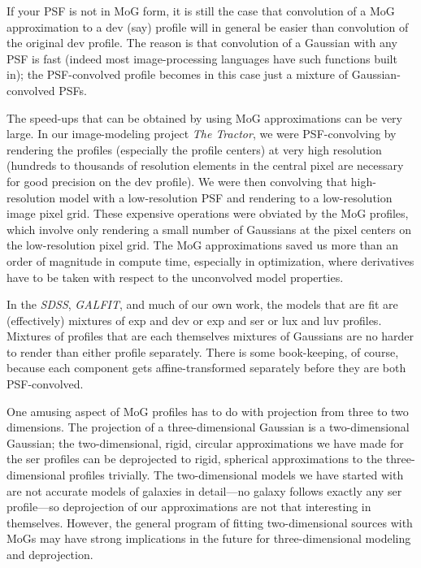 \documentclass[12pt,pdftex,preprint]{aastex}
\newcommand{\project}[1]{\textsl{#1}}
\begin{document}
If your PSF is not in MoG form, it is still the case that convolution
of a MoG approximation to a dev (say) profile will in general be
easier than convolution of the original dev profile.  The reason is
that convolution of a Gaussian with any PSF is fast (indeed most
image-processing languages have such functions built in); the
PSF-convolved profile becomes in this case just a mixture of
Gaussian-convolved PSFs.

The speed-ups that can be obtained by using MoG approximations can be
very large.  In our image-modeling project \project{The Tractor}, we
were PSF-convolving by rendering the profiles (especially the profile
centers) at very high resolution (hundreds to thousands of resolution
elements in the central pixel are necessary for good precision on the
dev profile).  We were then convolving that high-resolution model with
a low-resolution PSF and rendering to a low-resolution image pixel
grid.  These expensive operations were obviated by the MoG profiles,
which involve only rendering a small number of Gaussians at the pixel
centers on the low-resolution pixel grid.  The MoG approximations
saved us more than an order of magnitude in compute time, especially
in optimization, where derivatives have to be taken with respect to
the unconvolved model properties.

In the \project{SDSS}, \project{GALFIT}, and much of our own work, the
models that are fit are (effectively) mixtures of exp and dev or exp
and ser or lux and luv profiles.  Mixtures of profiles that are each
themselves mixtures of Gaussians are no harder to render than either
profile separately.  There is some book-keeping, of course, because
each component gets affine-transformed separately before they are both
PSF-convolved.

One amusing aspect of MoG profiles has to do with projection from
three to two dimensions.  The projection of a three-dimensional
Gaussian is a two-dimensional Gaussian; the two-dimensional, rigid,
circular approximations we have made for the ser profiles can be
deprojected to rigid, spherical approximations to the
three-dimensional profiles trivially.  The two-dimensional models we
have started with are not accurate models of galaxies in detail---no
galaxy follows exactly any ser profile---so deprojection of our
approximations are not that interesting in themselves.  However,
the general program of fitting two-dimensional sources with MoGs may
have strong implications in the future for three-dimensional modeling
and deprojection.
\end{document}
